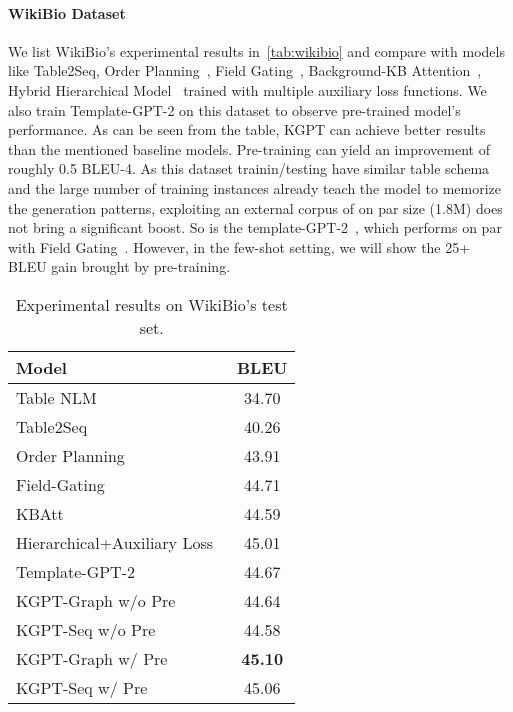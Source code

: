 \documentclass[11pt,a4paper]{article}
\newcommand{\model}{KGPT\xspace}
\begin{document}
\paragraph{WikiBio Dataset}
We list WikiBio's experimental results in~\autoref{tab:wikibio} and compare with models like Table2Seq\cite{bao2018table}, Order Planning~\cite{sha2018order}, Field Gating~\cite{liu2018table}, Background-KB Attention~\cite{chen2019enhancing}, Hybrid Hierarchical Model~\cite{liu2019hierarchical} trained with multiple auxiliary loss functions. We also train Template-GPT-2 on this dataset to observe pre-trained model's performance. As can be seen from the table, \model can achieve better results than the mentioned baseline models. Pre-training can yield an improvement of roughly 0.5 BLEU-4. As this dataset trainin/testing have similar table schema and the large number of training instances already teach the model to memorize the generation patterns, exploiting an external corpus of on par size (1.8M) does not bring a significant boost. So is the template-GPT-2~\cite{chen2020logical}, which performs on par with Field Gating~\cite{liu2018table}. However, in the few-shot setting, we will show the 25+ BLEU gain brought by pre-training.
\begin{table}[!thb]
\centering
\small
\begin{tabular}{lc}
\hline
Model              & BLEU \\
\hline
Table NLM~\cite{lebret2016neural}               & 34.70 \\
Table2Seq~\cite{bao2018table}          & 40.26 \\
Order Planning~\cite{sha2018order}              & 43.91 \\
Field-Gating~\cite{liu2018table}       & 44.71 \\
KBAtt~\cite{chen2019enhancing}              & 44.59 \\
Hierarchical+Auxiliary Loss~\cite{liu2019hierarchical}  & 45.01 \\
\hline
Template-GPT-2 & 44.67 \\
\model-Graph w/o Pre & 44.64  \\
\model-Seq w/o Pre &  44.58 \\
\hline
\model-Graph w/ Pre    & \textbf{45.10} \\
\model-Seq w/ Pre     & 45.06 \\
\hline
\end{tabular}
\caption{Experimental results on WikiBio's test set. }
\label{tab:wikibio}
\vspace{-2ex}
\end{table}
\end{document}
